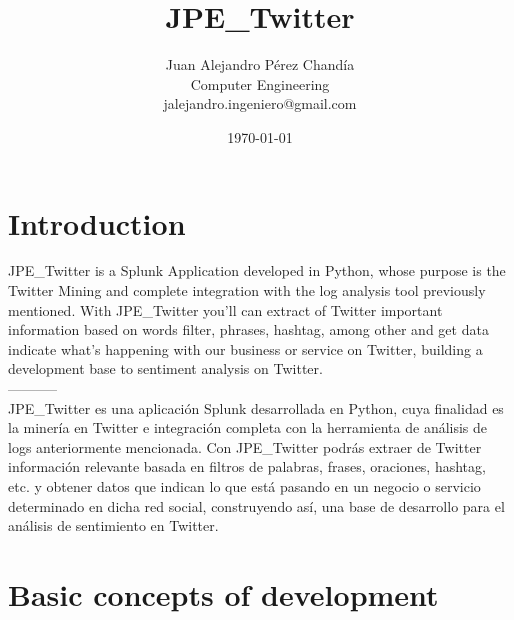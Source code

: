 \documentclass[report]{article}
\title{JPE\_Twitter} %
\author{%
    Juan Alejandro P\'erez Chand\'ia \\
    Computer Engineering\\
    jalejandro.ingeniero@gmail.com
}
\date{\today}
\begin{document}
\renewcommand*\contentsname{\color{skde}Contents}
\pagecolor{background}
\color{text}
\sloppy 


\addtocounter{page}{1}

\section{Introduction}
JPE\_Twitter is a Splunk Application developed in Python, whose purpose is the Twitter Mining and complete integration with the log analysis tool previously mentioned. With JPE\_Twitter you'll can extract of Twitter important information based on words filter, phrases, hashtag, among other and get data indicate what's happening with our business or service on Twitter, building a development base to sentiment analysis on Twitter.
\\-----------\\
JPE\_Twitter es una aplicaci\'on Splunk desarrollada en Python, cuya finalidad es la miner\'ia en Twitter e integraci\'on completa con la herramienta de an\'alisis de logs anteriormente mencionada. Con JPE\_Twitter podr\'as extraer de Twitter informaci\'on relevante basada en filtros de palabras, frases, oraciones, hashtag, etc. y obtener datos que indican lo que est\'a pasando en un negocio o servicio determinado en dicha red social, construyendo as\'i, una base de desarrollo para el an\'alisis de sentimiento en Twitter.
\newpage
\tableofcontents
\thispagestyle{empty}

\newpage
\section{Basic concepts of development}
\end{document}
